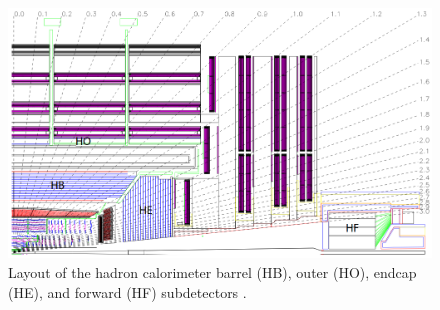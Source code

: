 \begin{figure}[hbtp]
\centering
\includegraphics[scale=0.35]{figures/lhc_and_cms/hcal_layout.png}
\caption{Layout of the hadron calorimeter barrel (HB), outer (HO), endcap (HE), and forward (HF) subdetectors \cite{cms_experiment}.}
\label{hcal_layout}
\end{figure}